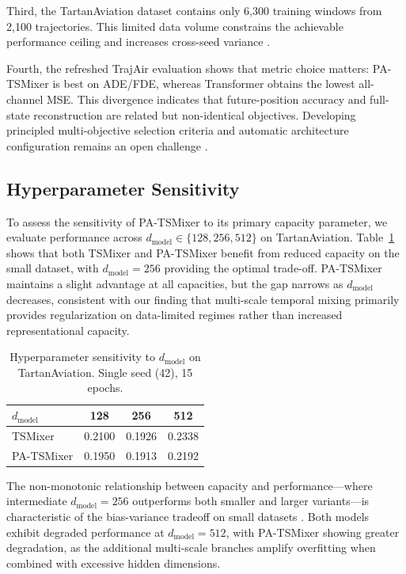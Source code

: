 \documentclass[letterpaper,journal]{IEEEtran}
\begin{document}
Third, the TartanAviation dataset contains only 6,300 training windows from 2,100
trajectories. This limited data volume constrains the achievable performance ceiling
and increases cross-seed variance \cite{Ayala2023}.

Fourth, the refreshed TrajAir evaluation shows that metric choice matters: PA-TSMixer
is best on ADE/FDE, whereas Transformer obtains the lowest all-channel MSE. This
divergence indicates that future-position accuracy and full-state reconstruction
are related but non-identical objectives. Developing principled multi-objective
selection criteria and automatic architecture configuration remains an open
challenge \cite{Chen2023TSMixer}.

\subsection{Hyperparameter Sensitivity}
To assess the sensitivity of PA-TSMixer to its primary capacity parameter, we
evaluate performance across $d_{\text{model}} \in \{128, 256, 512\}$ on TartanAviation.
Table~\ref{tab:sensitivity} shows that both TSMixer and PA-TSMixer benefit from
reduced capacity on the small dataset, with $d_{\text{model}}\!=\!256$ providing
the optimal trade-off. PA-TSMixer maintains a slight advantage at all capacities,
but the gap narrows as $d_{\text{model}}$ decreases, consistent with our finding
that multi-scale temporal mixing primarily provides regularization on data-limited
regimes rather than increased representational capacity.

\begin{table}[!t]
\caption{Hyperparameter sensitivity to $d_{\text{model}}$ on TartanAviation.
Single seed (42), 15 epochs.\label{tab:sensitivity}}
\centering
\begin{tabular}{lccc}
\toprule
$d_{\text{model}}$ & 128 & 256 & 512 \\
\midrule
TSMixer      & 0.2100 & 0.1926 & 0.2338 \\
PA-TSMixer   & 0.1950 & 0.1913 & 0.2192 \\
\bottomrule
\end{tabular}
\end{table}

The non-monotonic relationship between capacity and performance---where intermediate
$d_{\text{model}}\!=\!256$ outperforms both smaller and larger variants---is
characteristic of the bias-variance tradeoff on small datasets \cite{Ying2019}.
Both models exhibit degraded performance at $d_{\text{model}}\!=\!512$, with
PA-TSMixer showing greater degradation, as the additional multi-scale branches
amplify overfitting when combined with excessive hidden dimensions.
\end{document}
